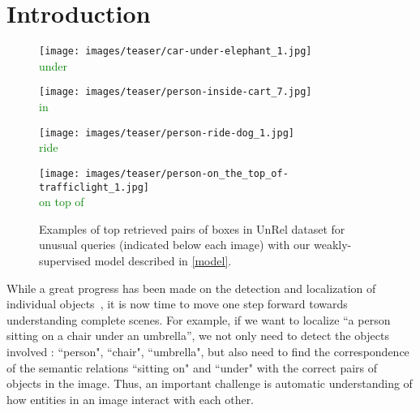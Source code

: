 \documentclass[10pt,twocolumn,letterpaper]{article}
\begin{document}
\section{Introduction}

\begin{figure}[t]
\centering
	\begin{minipage}[t]{0.23\textwidth}
    	\centering
    	\texttt{[image: images/teaser/car-under-elephant\_1.jpg]}\\
       	\color{blue}{car} \textcolor{Green}{under} \color{red}{elephant}
  		\vspace{1.5ex}
    \end{minipage}
    \begin{minipage}[t]{0.23\textwidth}
    	\centering
    	\texttt{[image: images/teaser/person-inside-cart\_7.jpg]}\\ 
    		\color{blue}{person} \textcolor{Green}{in} \color{red}{cart}
    		\vspace{1.5ex}
    \end{minipage}
    \begin{minipage}[t]{0.23\textwidth}
    	\centering
    	\texttt{[image: images/teaser/person-ride-dog\_1.jpg]}\\ 
 		\color{blue}{person} \textcolor{Green}{ride} \color{red}{dog}		
    \end{minipage}
    \begin{minipage}[t]{0.23\textwidth}
    	\centering
    	\texttt{[image: images/teaser/person-on\_the\_top\_of-trafficlight\_1.jpg]}\\
  		\color{blue}{person} \textcolor{Green}{on top of} \color{red}{traffic light}    	
    \end{minipage}
    \setlength\abovecaptionskip{0.2cm}
    \caption{Examples of top retrieved pairs of boxes in UnRel dataset for unusual queries (indicated below each image) with our weakly-supervised model described in \ref{model}.}
    \vspace{-.4cm}
    \label{teaser_figure}
\end{figure}


While a great progress has been made on the detection and localization of individual objects~\cite{ren15,zagoruyko2016multipath},
it is now time to move one step forward towards understanding complete scenes.
For example, if we want to localize ``a  person 
sitting on a chair under an umbrella'', we not only need to detect the objects
involved : ``person", ``chair", ``umbrella",  but also need to find the correspondence of the semantic relations ``sitting on" and
``under" with the correct pairs of objects in the image. Thus, an
important challenge is automatic understanding of how entities in an image interact with each other.  
\end{document}
